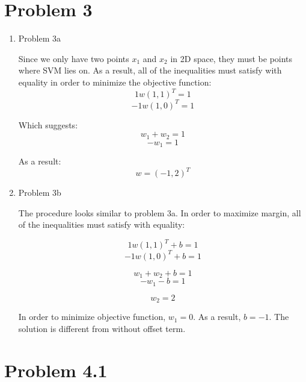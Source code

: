 \documentclass[11pt]{article}
\newcommand{\solution}[1]{{{\color{black}{\bf Solution:} {#1}}}}
\begin{document}
\section{Problem 3}
\begin{enumerate}
\item Problem 3a

\solution{Since we only have two points $x_1$ and $x_2$ in 2D space, they must be points where SVM lies on. As a result, all of the inequalities must satisfy with equality in order to minimize the objective function:
$$ 1w(1, 1)^T = 1$$
$$ -1w(1, 0)^T = 1$$

Which suggests:
$$ w_1 + w_2 = 1$$
$$ -w_1 = 1$$}

As a result:
$$ w = (-1, 2)^T $$


\item Problem 3b

\solution{The procedure looks similar to problem 3a. In order to maximize margin, all of the inequalities must satisfy with equality:

$$ 1w(1, 1)^T + b = 1$$
$$ -1w(1, 0)^T +b= 1$$

$$ w_1 + w_2 + b = 1$$
$$ -w_1 - b= 1$$

$$ w_2 = 2 $$

In order to minimize objective function, $w_1 = 0$. As a result, $b = -1$. The solution is different from without offset term.
}

\end{enumerate}

\vspace{5cm}
\newpage

\section{Problem 4.1}
\end{document}
